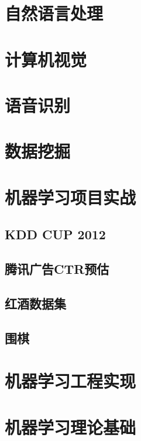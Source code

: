 \documentclass[UTF8,10pt,a4paper]{ctexbook}
\begin{document}
\part{自然语言处理}




\part{计算机视觉}



\part{语音识别}


\part{数据挖掘}


\part{机器学习项目实战}





\chapter{KDD CUP 2012}

\chapter{腾讯广告CTR预估}
\chapter{红酒数据集}
\chapter{围棋}



\part{机器学习工程实现}



\part{机器学习理论基础}

\end{document}
